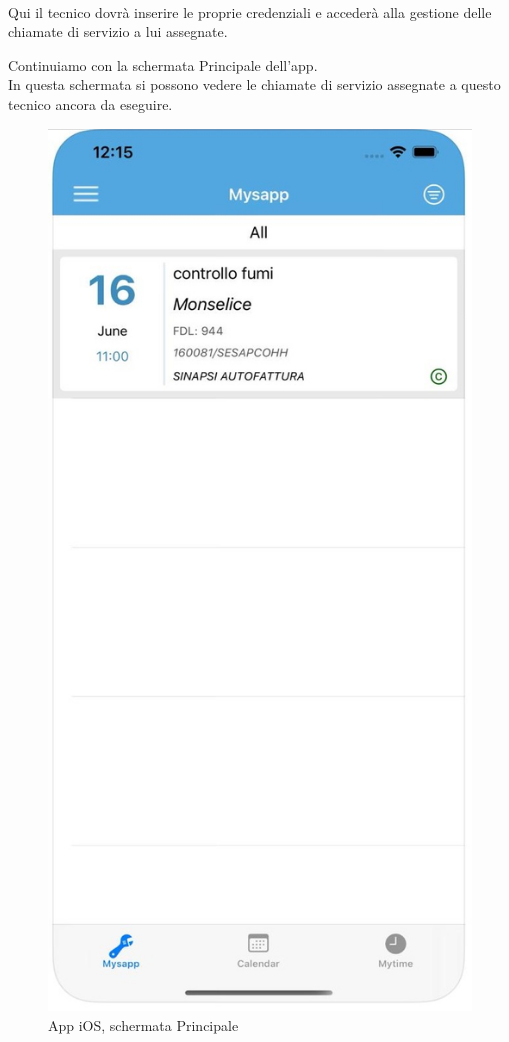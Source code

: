 \\Qui il tecnico dovrà inserire le proprie credenziali e accederà alla gestione delle chiamate di servizio a lui assegnate.
\newpage
\begin{flushleft}
	Continuiamo con la schermata Principale dell'app.
	\\In questa schermata si possono vedere le chiamate di servizio assegnate a questo tecnico ancora da eseguire.
\end{flushleft}
\begin{figure}[!h] 
	\centering 
	\includegraphics[scale = 0.13]{immagini/app iOS/elenco-interventi-iOS.jpeg} 
	\caption {App iOS, schermata Principale}
\end{figure}
